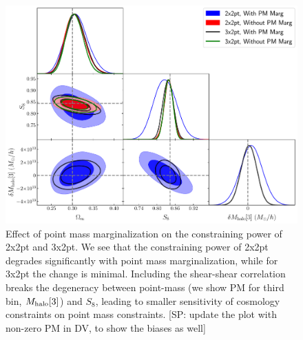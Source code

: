 \documentclass[fleqn,usenatbib]{mnras}
\newcommand{\SP}[1]{{\color{red}[SP: #1]}}
\begin{document}
\begin{figure}
\includegraphics[width=\columnwidth]{figs/PM_constraints_2x2pt_3x2pt.pdf}
\caption[]{Effect of point mass marginalization on the constraining power of 2x2pt and 3x2pt. We see that the constraining power of 2x2pt degrades significantly with point mass marginalization, while for 3x2pt the change is minimal. Including the shear-shear correlation  breaks the degeneracy between point-mass (we show PM for third bin, $M_{\rm halo}[3]$) and $S_8$, leading to smaller sensitivity of cosmology constraints on point mass constraints. \SP{update the plot with non-zero PM in DV, to show the biases as well} }
\label{fig:pm_effect}
\end{figure}
\end{document}
